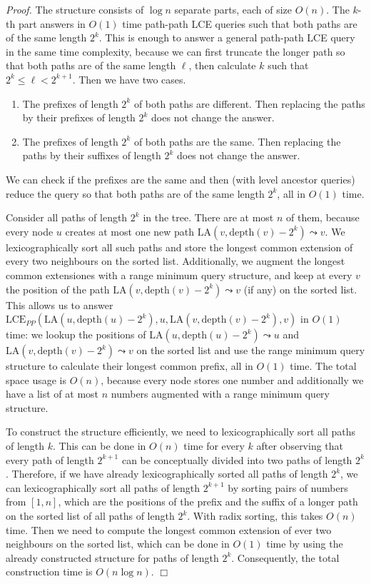 \documentclass [10pt]{article}
\newcommand{\qed}{\hfill\ensuremath{\Box}\medskip\\\noindent}
\newenvironment{proof}{\noindent\emph{Proof. }}{}
\newcommand{\depth}{\ensuremath{\mathrm{depth}}}
\newcommand{\LA}{\ensuremath{\mathrm{LA}}}
\newcommand{\LCEPP}{\ensuremath{\mathrm{LCE}_{\mathit{PP}}}}
\begin{document}
\begin{proof}
The structure consists of $\log n$ separate parts, each of size $O(n)$. The $k$-th part answers in $O(1)$ time path-path LCE queries such that both
paths are of the same length $2^{k}$. This is enough to answer a general path-path LCE query in the same time complexity, because we can first
truncate the longer path so that both paths are of the same length $\ell$, then calculate $k$ such that $2^{k}\leq \ell < 2^{k+1}$. Then
we have two cases.

\begin{enumerate}
\item The prefixes of length $2^{k}$ of both paths are different. Then replacing the paths by their prefixes of length $2^{k}$ does not
change the answer.
\item The prefixes of length $2^{k}$ of both paths are the same. Then replacing the paths by their suffixes of length $2^{k}$ does not
change the answer.
\end{enumerate}

We can check if the prefixes are the same and then (with level ancestor queries) reduce the query so that both paths are
of the same length $2^{k}$, all in $O(1)$ time.

Consider all paths of length $2^{k}$ in the tree. There are at most $n$ of them, because every node $u$ creates at most one new path
$\LA(v,\depth(v)-2^{k}) \leadsto v$. We lexicographically sort all such paths and store the longest common extension of every two neighbours
on the sorted list. Additionally, we augment the longest common extensiones with a range minimum query structure, and keep at every $v$ the
position of the path $\LA(v,\depth(v)-2^{k}) \leadsto v$ (if any) on the sorted list. This allows us to answer
$\LCEPP(\LA(u,\depth(u)-2^{k}),u,\LA(v,\depth(v)-2^{k}),v)$ in $O(1)$ time: we lookup the positions of $\LA(u,\depth(u)-2^{k}) \leadsto u$
and $\LA(v,\depth(v)-2^{k}) \leadsto v$ on the sorted list and use the range minimum query structure to calculate their longest common
prefix, all in $O(1)$ time. The total space usage is $O(n)$, because every node stores one number and additionally we have a list of at most
$n$ numbers augmented with a range minimum query structure.

To construct the structure efficiently, we need to lexicographically sort all paths of length $k$. This can be done in $O(n)$ time for every $k$ after
observing that every path of length $2^{k+1}$ can be conceptually divided into two paths of length $2^{k}$. Therefore, if we have already
lexicographically sorted all paths of length $2^{k}$, we can lexicographically sort all paths of length $2^{k+1}$ by sorting pairs of numbers
from $[1,n]$, which are the positions of the prefix and the suffix of a longer path on the sorted list of all paths of length $2^{k}$. With
radix sorting, this takes $O(n)$ time. Then we need to compute the longest common extension of ever two neighbours on the sorted list,
which can be done in $O(1)$ time by using the already constructed structure for paths of length $2^{k}$. Consequently, the total construction
time is $O(n\log n)$.
\qed
\end{proof}
\end{document}
